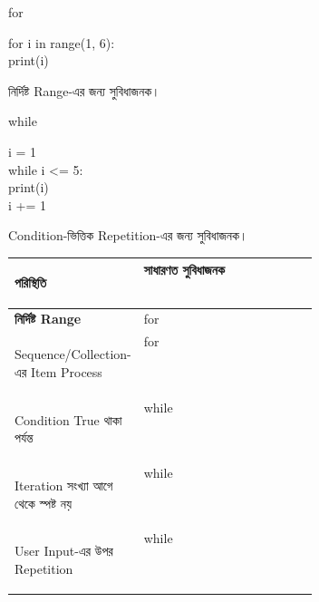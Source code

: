 \noindent
\begin{minipage}[t]{0.49\linewidth}

\begin{sideexamplebox}{\textenglish{\ttfamily for}}

\begin{sidecodebox}
\begin{english}
\ttfamily
for i in range(1, 6):\\
\hspace*{4mm}print(i)
\end{english}
\end{sidecodebox}

নির্দিষ্ট Range-এর জন্য সুবিধাজনক।

\end{sideexamplebox}

\end{minipage}
\hfill
\begin{minipage}[t]{0.49\linewidth}

\begin{sideexamplebox}{\textenglish{\ttfamily while}}

\begin{sidecodebox}
\begin{english}
\ttfamily
i = 1\\
while i <= 5:\\
\hspace*{4mm}print(i)\\
\hspace*{4mm}i += 1
\end{english}
\end{sidecodebox}

Condition-ভিত্তিক Repetition-এর জন্য সুবিধাজনক।

\end{sideexamplebox}

\end{minipage}

\begin{tabularx}
{\linewidth}
{
|>{\bfseries\RaggedRight\arraybackslash}p{0.39\linewidth}
|>{\centering\arraybackslash}Y|
}

\hline
{}

\textbf{পরিস্থিতি}
&
\textbf{সাধারণত সুবিধাজনক}
\\
\hline

নির্দিষ্ট Range
&
\textenglish{\ttfamily for}
\\
\hline

Sequence/Collection-এর Item Process
&
\textenglish{\ttfamily for}
\\
\hline

Condition True থাকা পর্যন্ত
&
\textenglish{\ttfamily while}
\\
\hline

Iteration সংখ্যা আগে থেকে স্পষ্ট নয়
&
\textenglish{\ttfamily while}
\\
\hline

User Input-এর উপর Repetition
&
\textenglish{\ttfamily while}
\\
\hline

\end{tabularx}

